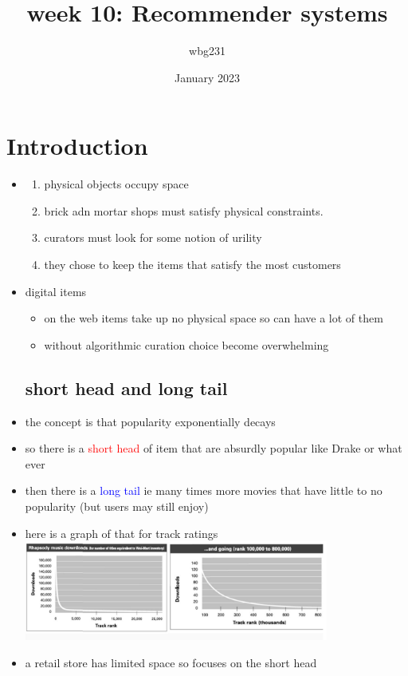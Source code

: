 \documentclass{article}
\title{week 10: Recommender systems }
\author{wbg231 }
\date{January 2023}
\begin{document}
\maketitle

\section{Introduction}
\begin{itemize}
\subsection*{why the need for recommendation}
\item 
\begin{enumerate}
\item physical objects occupy space
\item brick adn mortar shops must satisfy physical constraints. 
\item curators must look for some notion of urility 
\item they chose to keep the items that satisfy the most customers
\end{enumerate}
\item digital items
\begin{itemize}
    \item on the web items take up no physical space so can have a lot of them 
    \item without algorithmic curation choice become overwhelming 
\end{itemize}
\subsection*{short head and long tail}
\item the concept is that popularity exponentially decays 
\item so there is a \textcolor{red}{short head } of item that are absurdly popular like Drake or what ever 
\item  then there is a \textcolor{blue}{long tail } ie many times more movies that have little to no popularity (but users may still enjoy)
\item here is a graph of that for track ratings \\ \includegraphics*[width=10cm]{images/Screenshot 2023-05-11 at 4.02.28 PM.png}
\item a retail store has limited space so focuses on the short head

\end{itemize}
\end{document}
